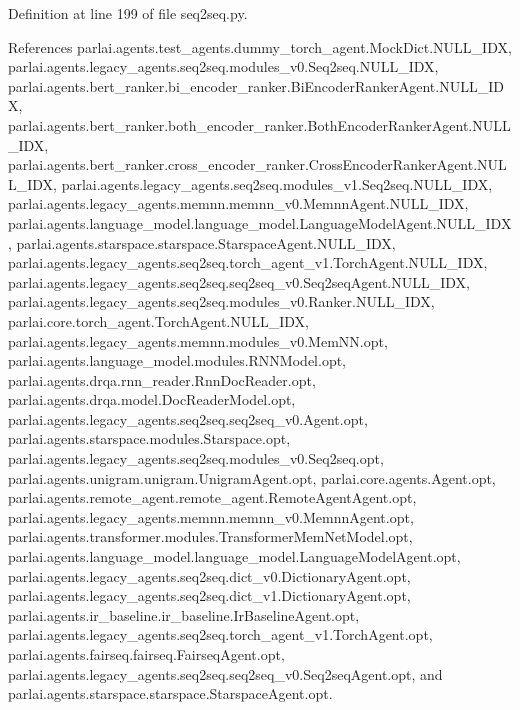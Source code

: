 Definition at line 199 of file seq2seq.\+py.



References parlai.\+agents.\+test\+\_\+agents.\+dummy\+\_\+torch\+\_\+agent.\+Mock\+Dict.\+N\+U\+L\+L\+\_\+\+I\+DX, parlai.\+agents.\+legacy\+\_\+agents.\+seq2seq.\+modules\+\_\+v0.\+Seq2seq.\+N\+U\+L\+L\+\_\+\+I\+DX, parlai.\+agents.\+bert\+\_\+ranker.\+bi\+\_\+encoder\+\_\+ranker.\+Bi\+Encoder\+Ranker\+Agent.\+N\+U\+L\+L\+\_\+\+I\+DX, parlai.\+agents.\+bert\+\_\+ranker.\+both\+\_\+encoder\+\_\+ranker.\+Both\+Encoder\+Ranker\+Agent.\+N\+U\+L\+L\+\_\+\+I\+DX, parlai.\+agents.\+bert\+\_\+ranker.\+cross\+\_\+encoder\+\_\+ranker.\+Cross\+Encoder\+Ranker\+Agent.\+N\+U\+L\+L\+\_\+\+I\+DX, parlai.\+agents.\+legacy\+\_\+agents.\+seq2seq.\+modules\+\_\+v1.\+Seq2seq.\+N\+U\+L\+L\+\_\+\+I\+DX, parlai.\+agents.\+legacy\+\_\+agents.\+memnn.\+memnn\+\_\+v0.\+Memnn\+Agent.\+N\+U\+L\+L\+\_\+\+I\+DX, parlai.\+agents.\+language\+\_\+model.\+language\+\_\+model.\+Language\+Model\+Agent.\+N\+U\+L\+L\+\_\+\+I\+DX, parlai.\+agents.\+starspace.\+starspace.\+Starspace\+Agent.\+N\+U\+L\+L\+\_\+\+I\+DX, parlai.\+agents.\+legacy\+\_\+agents.\+seq2seq.\+torch\+\_\+agent\+\_\+v1.\+Torch\+Agent.\+N\+U\+L\+L\+\_\+\+I\+DX, parlai.\+agents.\+legacy\+\_\+agents.\+seq2seq.\+seq2seq\+\_\+v0.\+Seq2seq\+Agent.\+N\+U\+L\+L\+\_\+\+I\+DX, parlai.\+agents.\+legacy\+\_\+agents.\+seq2seq.\+modules\+\_\+v0.\+Ranker.\+N\+U\+L\+L\+\_\+\+I\+DX, parlai.\+core.\+torch\+\_\+agent.\+Torch\+Agent.\+N\+U\+L\+L\+\_\+\+I\+DX, parlai.\+agents.\+legacy\+\_\+agents.\+memnn.\+modules\+\_\+v0.\+Mem\+N\+N.\+opt, parlai.\+agents.\+language\+\_\+model.\+modules.\+R\+N\+N\+Model.\+opt, parlai.\+agents.\+drqa.\+rnn\+\_\+reader.\+Rnn\+Doc\+Reader.\+opt, parlai.\+agents.\+drqa.\+model.\+Doc\+Reader\+Model.\+opt, parlai.\+agents.\+legacy\+\_\+agents.\+seq2seq.\+seq2seq\+\_\+v0.\+Agent.\+opt, parlai.\+agents.\+starspace.\+modules.\+Starspace.\+opt, parlai.\+agents.\+legacy\+\_\+agents.\+seq2seq.\+modules\+\_\+v0.\+Seq2seq.\+opt, parlai.\+agents.\+unigram.\+unigram.\+Unigram\+Agent.\+opt, parlai.\+core.\+agents.\+Agent.\+opt, parlai.\+agents.\+remote\+\_\+agent.\+remote\+\_\+agent.\+Remote\+Agent\+Agent.\+opt, parlai.\+agents.\+legacy\+\_\+agents.\+memnn.\+memnn\+\_\+v0.\+Memnn\+Agent.\+opt, parlai.\+agents.\+transformer.\+modules.\+Transformer\+Mem\+Net\+Model.\+opt, parlai.\+agents.\+language\+\_\+model.\+language\+\_\+model.\+Language\+Model\+Agent.\+opt, parlai.\+agents.\+legacy\+\_\+agents.\+seq2seq.\+dict\+\_\+v0.\+Dictionary\+Agent.\+opt, parlai.\+agents.\+legacy\+\_\+agents.\+seq2seq.\+dict\+\_\+v1.\+Dictionary\+Agent.\+opt, parlai.\+agents.\+ir\+\_\+baseline.\+ir\+\_\+baseline.\+Ir\+Baseline\+Agent.\+opt, parlai.\+agents.\+legacy\+\_\+agents.\+seq2seq.\+torch\+\_\+agent\+\_\+v1.\+Torch\+Agent.\+opt, parlai.\+agents.\+fairseq.\+fairseq.\+Fairseq\+Agent.\+opt, parlai.\+agents.\+legacy\+\_\+agents.\+seq2seq.\+seq2seq\+\_\+v0.\+Seq2seq\+Agent.\+opt, and parlai.\+agents.\+starspace.\+starspace.\+Starspace\+Agent.\+opt.

